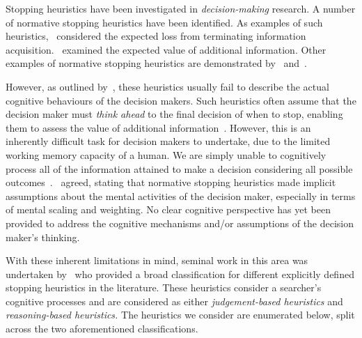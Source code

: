 Stopping heuristics have been investigated in \emph{decision-making} research. A number of normative stopping heuristics have been identified. As examples of such heuristics,~\cite{busemeyer1988deferred_decision_making} considered the expected loss from terminating information acquisition.~\cite{kogut1990sunk_costs} examined the expected value of additional information. Other examples of normative stopping heuristics are demonstrated by~\cite{pitz1969information_seeking} and~\cite{busemeyer1988deferred_decision_making}.

However, as outlined by~\cite{browne2004stopping_rules}, these heuristics usually fail to describe the actual cognitive behaviours of the decision makers. Such heuristics often assume that the decision maker must \emph{think ahead} to the final decision of when to stop, enabling them to assess the value of additional information~\citep{busemeyer1988deferred_decision_making}. However, this is an inherently difficult task for decision makers to undertake, due to the limited working memory capacity of a human. We are simply unable to cognitively process all of the information attained to make a decision considering all possible outcomes~\citep{browne2004stopping_rules}.~\cite{nickles1995judgment} agreed, stating that normative stopping heuristics made implicit assumptions about the mental activities of the decision maker, especially in terms of mental scaling and weighting. No clear cognitive perspective has yet been provided to address the cognitive mechanisms and/or assumptions of the decision maker's thinking.

With these inherent limitations in mind, seminal work in this area was undertaken by~\cite{nickles1995judgment} who provided a broad classification for different explicitly defined stopping heuristics in the literature. These heuristics consider a searcher's cognitive processes and are considered as either \emph{judgement-based heuristics} and \emph{reasoning-based heuristics.} The heuristics we consider are enumerated below, split across the two aforementioned classifications.

